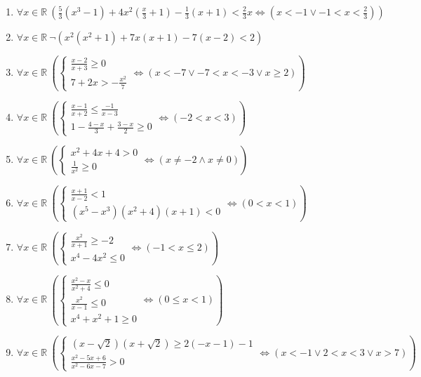 \documentclass[11pt,a4paper]{article}
\begin{document}
\begin{enumerate}
\item $\displaystyle \forall x \in \mathbb{R}\ \left( \frac{5}{3}(x^{3} - 1) + 4x^{2}\left(\frac{x}{3} + 1\right) - \frac{1}{3}(x + 1) < \frac{2}{3}x \iff \left( x < -1 \lor -1 < x < \frac{2}{3} \right) \right)$
\item $\displaystyle \forall x \in \mathbb{R}\ \lnot \left( x^{2}(x^{2} + 1) + 7x(x + 1) - 7(x - 2) < 2 \right)$
\item $\displaystyle \forall x \in \mathbb{R}\ \left( \begin{cases} \frac{x - 2}{x + 3} \ge 0 \\ 7 + 2x > -\frac{x^{2}}{7} \end{cases} \iff \left( x < -7 \lor -7 < x < -3 \lor x \ge 2 \right) \right)$
\item $\displaystyle \forall x \in \mathbb{R}\ \left( \begin{cases} \frac{x - 1}{x + 2} \le \frac{-1}{x - 3} \\ 1 - \frac{4 - x}{3} + \frac{3 - x}{2} \ge 0 \end{cases} \iff \left( -2 < x < 3 \right) \right)$
\item $\displaystyle \forall x \in \mathbb{R}\ \left( \begin{cases} x^{2} + 4x + 4 > 0 \\ \frac{1}{x^{2}} \ge 0 \end{cases} \iff \left( x \neq -2 \land x \neq 0 \right) \right)$
\item $\displaystyle \forall x \in \mathbb{R}\ \left( \begin{cases} \frac{x + 1}{x - 2} < 1 \\ (x^{5} - x^{3})(x^{2} + 4)(x + 1) < 0 \end{cases} \iff \left( 0 < x < 1 \right) \right)$
\item $\displaystyle \forall x \in \mathbb{R}\ \left( \begin{cases} \frac{x^{2}}{x + 1} \ge -2 \\ x^{4} - 4x^{2} \le 0 \end{cases} \iff \left( -1 < x \le 2 \right) \right)$
\item $\displaystyle \forall x \in \mathbb{R}\ \left( \begin{cases} \frac{x^{2} - x}{x^{2} + 4} \le 0 \\ \frac{x^{2}}{x - 1} \le 0 \\ x^{4} + x^{2} + 1 \ge 0 \end{cases} \iff \left( 0 \le x < 1 \right) \right)$
\item $\displaystyle \forall x \in \mathbb{R}\ \left( \begin{cases} (x - \sqrt{2})(x + \sqrt{2}) \ge 2(-x - 1) - 1 \\ \frac{x^{2} - 5x + 6}{x^{2} - 6x - 7} > 0 \end{cases} \iff \left( x < -1 \lor 2 < x < 3 \lor x > 7 \right) \right)$

\end{enumerate}
\end{document}
